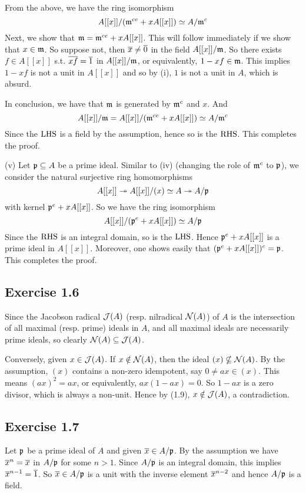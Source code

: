 \documentclass[../A&M.tex]{subfiles}
\begin{document}
From the above, we have the ring isomorphism
$$
A[[x]]/ (\mathfrak{m}^{ce} + xA[[x]]) \simeq A/\mathfrak{m}^c
$$
Next, we show that $\mathfrak{m} = \mathfrak{m}^{ce} + xA[[x]]$. This will follow immediately if we show that $x\in\mathfrak{m}$. So suppose not, then $\overline{x}\neq\overline{0}$ in the field $A[[x]]/\mathfrak{m}$. So there exists $f\in A[[x]]$ s.t. $\overline{xf}=\overline{1}$ in $A[[x]]/\mathfrak{m}$, or equivalently, $1-xf\in \mathfrak{m}$. This implies $1-xf$ is not a unit in $A[[x]]$ and so by (i), $1$ is not a unit in $A$, which is absurd.

In conclusion, we have that $\mathfrak{m}$ is generated by $\mathfrak{m}^c$ and $x$. And
$$
A[[x]]/\mathfrak{m} = A[[x]]/ (\mathfrak{m}^{ce} + xA[[x]]) \simeq A/\mathfrak{m}^c
$$
Since the $\operatorname{LHS}$ is a field by the assumption, hence so is the $\operatorname{RHS}$. This completes the proof.

(v) Let $\mathfrak{p}\subseteq A$ be a prime ideal. Similar to (iv) (changing the role of $\mathfrak{m}^c$ to $\mathfrak{p}$), we consider the natural surjective ring homomorphisms
$$
A[[x]] \twoheadrightarrow A[[x]]/(x) \simeq A \twoheadrightarrow A/\mathfrak{p}
$$
with kernel $\mathfrak{p}^e  + xA[[x]]$. So we have the ring isomorphism
$$
A[[x]]/ (\mathfrak{p}^e + xA[[x]]) \simeq A/\mathfrak{p}
$$
Since the $\operatorname{RHS}$ is an integral domain, so is the $\operatorname{LHS}$. Hence $\mathfrak{p}^e + xA[[x]]$ is a prime ideal in $A[[x]]$. Moreover, one shows easily that $(\mathfrak{p}^e+xA[[x]])^c = \mathfrak{p}$. This completes the proof.

\subsection*{Exercise 1.6}

Since the Jacobson radical $\mathcal{J}(A)$ (resp. nilradical $\mathcal{N}(A)$) of $A$ is the intersection of all maximal (resp. prime) ideals in $A$, and all maximal ideals are necessarily prime ideals, so clearly $\mathcal{N}(A) \subseteq \mathcal{J}(A)$.

Conversely, given $x\in \mathcal{J}(A)$. If $x\notin\mathcal{N}(A)$, then the ideal $(x)\nsubseteq\mathcal{N}(A)$. By the assumption, $(x)$ contains a non-zero idempotent, say $0\neq ax\in(x)$. This means $(ax)^2=ax$, or equivalently, $ax(1-ax)=0$. So $1-ax$ is a zero divisor, which is always a non-unit. Hence by (1.9), $x\notin\mathcal{J}(A)$, a contradiction.

\subsection*{Exercise 1.7}

Let $\mathfrak{p}$ be a prime ideal of $A$ and given $\overline{x}\in A/\mathfrak{p}$. By the assumption we have $\overline{x}^n=\overline{x}$ in $A/\mathfrak{p}$ for some $n>1$. Since $A/\mathfrak{p}$ is an integral domain, this implies $\overline{x}^{n-1}=\overline{1}$. So $\overline{x}\in A/\mathfrak{p}$ is a unit with the inverse element $\overline{x}^{n-2}$ and hence $A/\mathfrak{p}$ is a field.
\end{document}
